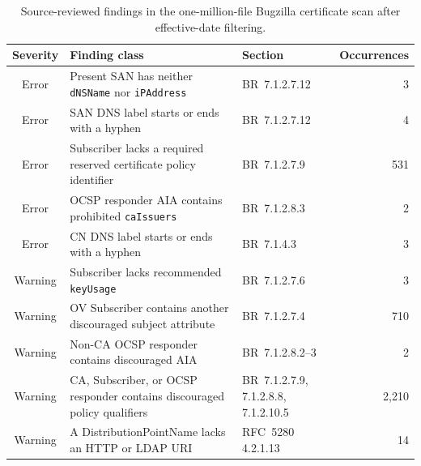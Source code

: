 \begin{table}[t]
\centering
\small
\setlength{\tabcolsep}{4pt}
\caption{Source-reviewed findings in the one-million-file Bugzilla certificate scan after effective-date filtering.}
\label{tab:bugzilla-findings}
\begin{tabularx}{\textwidth}{@{}c X L{0.25\textwidth} r@{}}
\toprule
Severity & Finding class & Section & Occurrences \\
\midrule
Error & Present SAN has neither \texttt{dNSName} nor \texttt{iPAddress} & BR~7.1.2.7.12 & 3 \\
Error & SAN DNS label starts or ends with a hyphen & BR~7.1.2.7.12 & 4 \\
Error & Subscriber lacks a required reserved certificate policy identifier & BR~7.1.2.7.9 & 531 \\
Error & OCSP responder AIA contains prohibited \texttt{caIssuers} & BR~7.1.2.8.3 & 2 \\
Error & CN DNS label starts or ends with a hyphen & BR~7.1.4.3 & 3 \\
Warning & Subscriber lacks recommended \texttt{keyUsage} & BR~7.1.2.7.6 & 3 \\
Warning & OV Subscriber contains another discouraged subject attribute & BR~7.1.2.7.4 & 710 \\
Warning & Non-CA OCSP responder contains discouraged AIA & BR~7.1.2.8.2--3 & 2 \\
Warning & CA, Subscriber, or OCSP responder contains discouraged policy qualifiers & BR~7.1.2.7.9, 7.1.2.8.8, 7.1.2.10.5 & 2,210 \\
Warning & A DistributionPointName lacks an HTTP or LDAP URI & RFC~5280 4.2.1.13 & 14 \\
\bottomrule
\end{tabularx}
\end{table}


